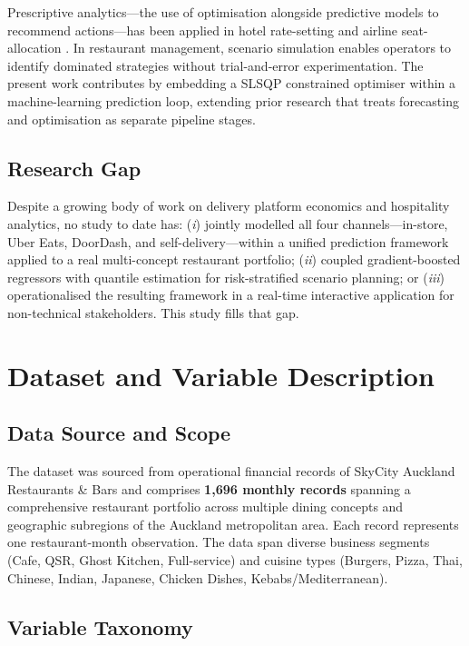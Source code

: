 \documentclass[10pt,a4paper,twocolumn]{article}
\begin{document}
Prescriptive analytics—the use of optimisation alongside predictive models to recommend
actions—has been applied in hotel rate-setting \citep{bertsimas2019prescrip} and airline
seat-allocation \citep{talluri2004theory}. In restaurant management, scenario simulation
enables operators to identify dominated strategies without trial-and-error experimentation.
The present work contributes by embedding a SLSQP constrained optimiser within a
machine-learning prediction loop, extending prior research that treats forecasting and
optimisation as separate pipeline stages.

\subsection{Research Gap}

Despite a growing body of work on delivery platform economics and hospitality analytics,
no study to date has: (\textit{i}) jointly modelled all four channels—in-store, Uber Eats,
DoorDash, and self-delivery—within a unified prediction framework applied to a real
multi-concept restaurant portfolio; (\textit{ii}) coupled gradient-boosted regressors with
quantile estimation for risk-stratified scenario planning; or (\textit{iii}) operationalised
the resulting framework in a real-time interactive application for non-technical stakeholders.
This study fills that gap.

\section{Dataset and Variable Description}
\label{sec:data}

\subsection{Data Source and Scope}

The dataset was sourced from operational financial records of SkyCity Auckland
Restaurants \& Bars and comprises \textbf{1{,}696 monthly records} spanning a
comprehensive restaurant portfolio across multiple dining concepts and geographic
subregions of the Auckland metropolitan area. Each record represents one
restaurant-month observation. The data span diverse business segments (Cafe, QSR,
Ghost Kitchen, Full-service) and cuisine types (Burgers, Pizza, Thai, Chinese, Indian,
Japanese, Chicken Dishes, Kebabs/Mediterranean).

\subsection{Variable Taxonomy}
\end{document}
